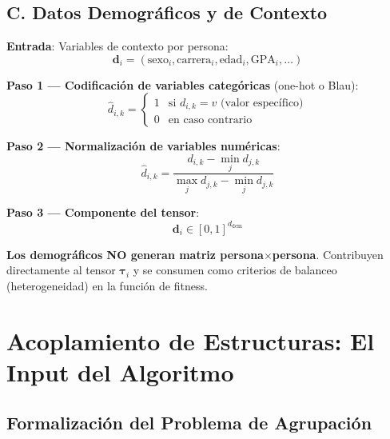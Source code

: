 \documentclass[12pt,a4paper]{article}
\begin{document}
\subsection{C. Datos Demográficos y de Contexto}
\label{subsec:demographic}

\begin{formulaBox}
\textbf{Entrada}: Variables de contexto por persona:
\[
\mathbf{d}_i = (\text{sexo}_i, \text{carrera}_i, \text{edad}_i, \text{GPA}_i, \ldots)
\]

\textbf{Paso 1 --- Codificación de variables categóricas} (one-hot o Blau):
\[
\hat{d}_{i,k} = \begin{cases} 1 & \text{si } d_{i,k} = v \text{ (valor específico)} \\ 0 & \text{en caso contrario} \end{cases}
\]

\textbf{Paso 2 --- Normalización de variables numéricas}:
\[
\hat{d}_{i,k} = \frac{d_{i,k} - \min_j d_{j,k}}{\max_j d_{j,k} - \min_j d_{j,k}}
\]

\textbf{Paso 3 --- Componente del tensor}:
\[
\mathbf{d}_i \in [0, 1]^{d_{\text{dem}}}
\]
\end{formulaBox}

\textbf{Los demográficos NO generan matriz persona$\times$persona}. Contribuyen directamente al tensor $\boldsymbol{\tau}_i$ y se consumen como criterios de balanceo (heterogeneidad) en la función de fitness.

\section{Acoplamiento de Estructuras: El Input del Algoritmo}
\label{sec:coupling}

\subsection{Formalización del Problema de Agrupación}
\end{document}
